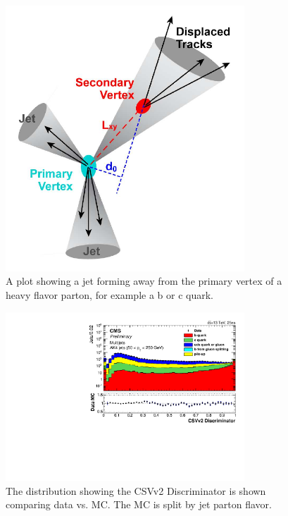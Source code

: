 \begin{figure}[!ht]
  \begin{center}
      \includegraphics[width=0.8\textwidth]{evtsel/figs/secondaryVTX.pdf}
    \caption{
      \label{fig:secondaryVTX}
      A plot showing a jet forming away from the primary vertex of a heavy flavor parton, for example a b or c quark.
    }
  \end{center}
\end{figure}

\begin{figure}[!ht]
  \begin{center}
      \includegraphics[width=0.8\textwidth]{evtsel/figs/ak4Inclusive_CSVIVF_Log.pdf}
    \caption{
      The distribution showing the CSVv2 Discriminator is shown comparing data vs. MC.
      The MC is split by jet parton flavor.
      \label{fig:csv}
    }
  \end{center}
\end{figure}

